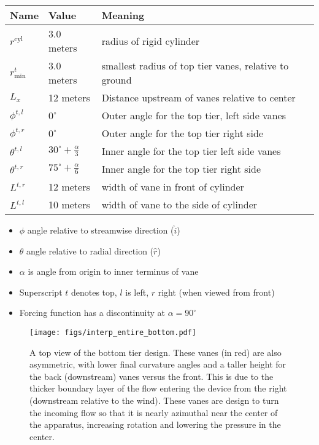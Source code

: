 \begin{table}[]
\centering
\begin{tabular}{lll}
Name                        & Value & Meaning                    \\
 \hline
$r^{\text{cyl}}$            &  3.0 meters & radius of rigid cylinder \\
$r^t_{\text{min}}$          &  3.0 meters & smallest radius of top tier
	 vanes, relative to ground \\
$L_x$                       &  12 meters  & Distance upstream
	 of vanes relative to center\\
$\phi^{t,l}$ &  $0^{\circ}$   & Outer angle for the top tier, left side vanes \\
$\phi^{t,r}$   &  $0^{\circ}$   & Outer angle for the top tier right side \\
$\theta^{t,l}$ &   $30^{\circ} +\frac{\alpha}{3}$  & Inner angle for the top tier left side vanes\\
$\theta^{t,r}$   &   $75^{\circ} +\frac{\alpha}{6}$   & Inner angle for the top tier right side \\
$L^{t,r}$                   &  12 meters  & width of vane in front of cylinder \\
$L^{t,l}$                   &  10 meters  & width of vane to the side of cylinder \\
\end{tabular}
\end{table}

\begin{itemize}
 \item $\phi$  angle relative to streamwise direction ($\hat i$)
 \item $\theta$ angle relative to radial direction ($\hat r$)
 \item $\alpha$ is angle from origin to inner terminus of vane
 \item Superscript $t$ denotes top, $l$ is left, $r$ right (when viewed
       from front)
 \item Forcing function has a discontinuity at $\alpha=90^{\circ}$
\end{itemize}

 \begin{figure}[!htb]
  \begin{center}
   \texttt{[image: figs/interp\_entire\_bottom.pdf]}
   \caption{A top view of the bottom tier design. These vanes (in red)
   are also asymmetric, with lower final curvature angles and a taller
   height for the back (downstream) vanes versus the front. This is due
   to the thicker boundary layer of the flow entering the device from
   the right (downstream relative to the wind). These vanes are design
   to turn the incoming flow so that it is nearly azimuthal near the
   center of the apparatus, increasing rotation and lowering the
   pressure in the center.}
   \label{fig:bottom_design}
  \end{center}
 \end{figure}

